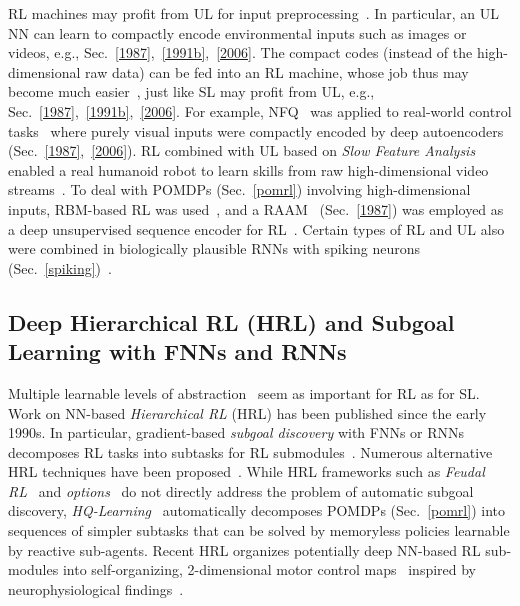 \documentclass[letterpaper]{article}
\begin{document}
\begin{CJK*}{UTF8}{gbsn}
RL machines 
may profit from UL for input preprocessing~\citep[e.g.,][]{Jodogne07}.
In particular, an UL NN  can 
learn to compactly encode environmental inputs such as images or videos,
e.g., Sec.~\ref{1987},~\ref{1991b},~\ref{2006}.
The compact codes (instead of the high-dimensional 
raw data) can be fed into an RL machine,
whose job thus may become much easier~\citep{Legenstein2010,cuccu2011},
just like SL may profit from UL, e.g., Sec.~\ref{1987},~\ref{1991b},~\ref{2006}.
For example, NFQ~\citep{nfq} was applied to real-world control tasks~\citep{lange,rieijcnn12} 
where purely visual inputs were compactly encoded by deep
autoencoders (Sec.~\ref{1987},~\ref{2006}). 
RL combined with 
UL based on {\em Slow Feature Analysis}~\citep{WisSej2002,DBLP:journals/neco/KompellaLS12} enabled
a real humanoid robot to learn skills from raw high-dimensional video streams~\citep{luciwkomp13}.
To deal with POMDPs (Sec.~\ref{pomrl}) involving high-dimensional inputs, 
RBM-based RL was used~\citep{otsuka2010phd},
and a RAAM~\citep{pollack1988implications} (Sec.~\ref{1987})
was employed as a deep unsupervised sequence encoder  
 for RL~\citep{Gisslen2011agi}.
Certain types of RL and UL also were combined in biologically plausible RNNs with spiking 
neurons (Sec.~\ref{spiking})~\citep[e.g.,][]{yin2012,maass2013,rezende2014}.



\subsection{Deep Hierarchical RL (HRL) and Subgoal Learning with FNNs and RNNs}
\label{subrl}
 
Multiple learnable 
levels of abstraction~\citep{Fu:77,Lenat:84,Ring:94,bengio2013tpami,lideng2014} seem as important for RL as for SL. 
Work on NN-based {\em Hierarchical RL} (HRL) has been
published since the early 1990s. 
In particular,
gradient-based {\em subgoal discovery} with FNNs or RNNs decomposes RL tasks into subtasks
for RL submodules~\citep{Schmidhuber:91icannsubgoals,SchmidhuberWahnsiedler:92sab}.
Numerous alternative HRL techniques have been proposed~\citep[e.g.,][]{Ring:91,Ring:94,Jameson:91,TenenbergKarlssonWhitehead,Weiss:94a,partigame,Precup:MTimeNIPS98,Dietterich:MAXQ,menache2002,DoyaSamejimaKatagiriKawato,ghavamzadehICML03,barto2003hrl,SamejimaDoyaKawato,Bakker:04ias,stoneML05,simsek2008skill}.
While HRL frameworks such as {\em Feudal RL}~\citep{Dayan:93} 
and {\em options}~\citep{sutton1999between,Barto:04,Singh:05nips} 
do not directly address the problem of automatic subgoal discovery,
{\em HQ-Learning}~\citep{Wiering:97ab}  automatically decomposes POMDPs (Sec.~\ref{pomrl})
into sequences of simpler subtasks that can be solved by memoryless policies
learnable by reactive sub-agents.    
Recent HRL organizes potentially deep NN-based RL sub-modules into
self-organizing, 2-dimensional motor control maps~\citep{ring:icdl2011}
inspired by neurophysiological findings~\citep{Graziano:book}.




\end{CJK*}
\end{document}
